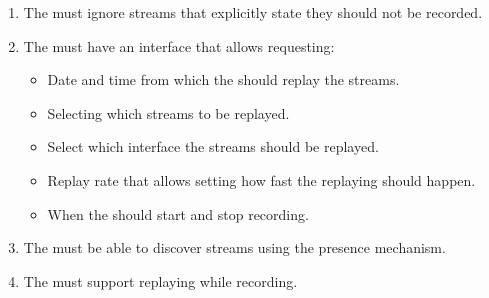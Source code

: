 \begin{enumerate}[ref=R-A-P-\arabic* on P.\thepage]
	\item The  must ignore streams that explicitly state they should not be recorded.
	\item The  must have an interface that allows requesting:
	\begin{itemize}
		\item Date and time from which the  should replay the streams.
		\item Selecting which streams to be replayed.
		\item Select which interface the streams should be replayed.
		\item Replay rate that allows setting how fast the replaying should happen.
		\item When the  should start and stop recording.
	\end{itemize}
	\item The  must be able to discover streams using the presence mechanism.
	\item The  must support replaying while recording. \label{req:a:h:replaywhilerecord}
\end{enumerate}

